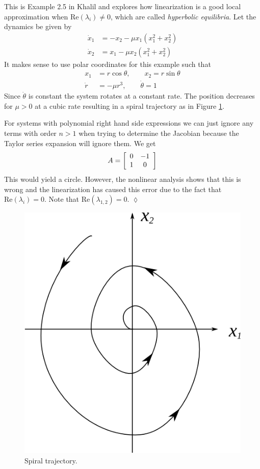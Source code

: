 \begin{example}
This is Example 2.5 in Khalil and explores how linearization is a good local approximation when $\text{Re}(\lambda_i)\neq0$, which are called \textit{hyperbolic equilibria}. Let the dynamics be given by
\begin{align*}
\dot{x}_1 &= -x_2 - \mu x_1(x_1^2 + x_2^2) \\
\dot{x}_2 &= x_1 - \mu x_2(x_1^2 + x_2^2)
\end{align*}
It makes sense to use polar coordinates for this example such that
\begin{align*}
x_1 &= r\cos\theta, \qquad x_2 = r\sin\theta \\
\dot{r} &= -\mu r^3, \qquad \dot{\theta} = 1
\end{align*}
Since $\dot{\theta}$ is constant the system rotates at a constant rate. The position decreases for $\mu>0$ at a cubic rate resulting in a spiral trajectory as in Figure \ref{fig:03cubic}.

For systems with polynomial right hand side expressions we can just ignore any terms with order $n>1$ when trying to determine the Jacobian because the Taylor series expansion will ignore them. We get
$$A = \left[\begin{array}{c c} 0 & -1 \\ 1 & 0 \end{array}\right]$$
This would yield a circle. However, the nonlinear analysis shows that this is wrong and the linearization has caused this error due to the fact that $\text{Re}(\lambda_i) = 0$. Note that $\text{Re}(\lambda_{1,2}) = 0$.
$\lozenge$
\end{example}

\begin{figure}[ht!]
	\centering
	\includegraphics[width=.5\textwidth]{images/03cubic}
	\caption{Spiral trajectory.}
	\label{fig:03cubic}
\end{figure}

